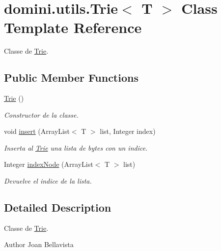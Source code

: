 \hypertarget{classdomini_1_1utils_1_1Trie}{}\section{domini.\+utils.\+Trie$<$ T $>$ Class Template Reference}
\label{classdomini_1_1utils_1_1Trie}


Classe de \hyperlink{classdomini_1_1utils_1_1Trie}{Trie}.  


\subsection*{Public Member Functions}
\begin{DoxyCompactItemize}
\item 
\mbox{\label{classdomini_1_1utils_1_1Trie_aa47b21b235e9dab115f3f97726837d5f}} 
\hyperlink{classdomini_1_1utils_1_1Trie_aa47b21b235e9dab115f3f97726837d5f}{Trie} ()
\begin{DoxyCompactList}\small\item\em Constructor de la classe. \end{DoxyCompactList}\item 
void \hyperlink{classdomini_1_1utils_1_1Trie_a3599001d9b056f0b54ab7eabb9d3510b}{insert} (Array\+List$<$ T $>$ list, Integer index)
\begin{DoxyCompactList}\small\item\em Inserta al \hyperlink{classdomini_1_1utils_1_1Trie}{Trie} una lista de bytes con un indice. \end{DoxyCompactList}\item 
Integer \hyperlink{classdomini_1_1utils_1_1Trie_a5c30e36df9ab804bbc054805358ecf2a}{index\+Node} (Array\+List$<$ T $>$ list)
\begin{DoxyCompactList}\small\item\em Devuelve el indice de la lista. \end{DoxyCompactList}\end{DoxyCompactItemize}


\subsection{Detailed Description}
Classe de \hyperlink{classdomini_1_1utils_1_1Trie}{Trie}. 

\begin{DoxyAuthor}{Author}
Joan Bellavista 
\end{DoxyAuthor}


